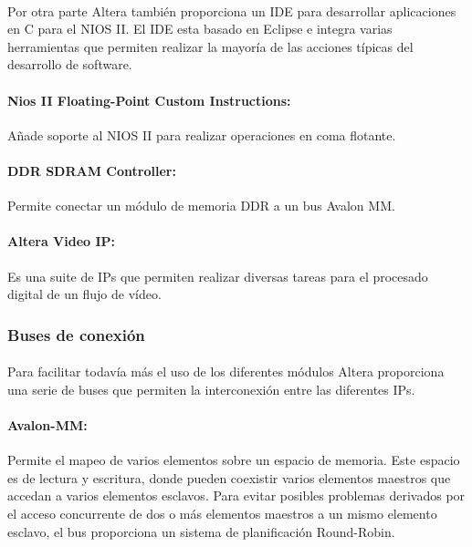 \documentclass[a4paper,12pt,titlepage,final]{book}
\begin{document}
\paragraph{}
Por otra parte Altera también proporciona un IDE para desarrollar aplicaciones en C para el NIOS II. El IDE esta basado en Eclipse e integra varias herramientas que permiten realizar la mayoría de las acciones típicas del desarrollo de software.

\paragraph{Nios II Floating-Point Custom Instructions:}
Añade soporte al NIOS II para realizar operaciones en coma flotante.

\paragraph{DDR SDRAM Controller:}
Permite conectar un módulo de memoria DDR a un bus Avalon MM.

\paragraph{Altera Video IP:}
Es una suite de IPs que permiten realizar diversas tareas para el procesado digital de un flujo de vídeo.

\subsubsection{Buses de conexión}

\paragraph{}
Para facilitar todavía más el uso de los diferentes módulos Altera proporciona una serie de buses que permiten la interconexión entre las diferentes IPs.

\paragraph{Avalon-MM:}
Permite el mapeo de varios elementos sobre un espacio de memoria. Este espacio es de lectura y escritura, donde pueden coexistir varios elementos maestros que accedan a varios elementos esclavos. Para evitar posibles problemas derivados por el acceso concurrente de dos o más elementos maestros a un mismo elemento esclavo, el bus proporciona un sistema de planificación Round-Robin.
\end{document}
